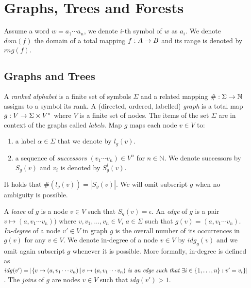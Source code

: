 \section{Graphs, Trees and Forests}
\label{sec:graph}

Assume a word $w = a_1 \cdots a_n$, we denote $i$-th symbol of $w$ as $a_i$.
We denote $dom(f)$ the domain of a total mapping $f: A \rightarrow B$ and its range is denoted by $rng(f)$.

\subsection{Graphs and Trees}
\label{subsec:graph}
A \emph{ranked alphabet} is a finite set of symbols $\Sigma$ and a related mapping $\#: \Sigma \rightarrow \mathbb{N}$
assigns to a symbol its rank.
A (directed, ordered, labelled) \emph{graph} is a total map $g: V \rightarrow \Sigma \times V^{*}$ where $V$ is a finite set of nodes.
The items of the set $\Sigma$ are in context of the graphs called \emph{labels}.
Map $g$ maps each node $v\in V$ to:
\begin{enumerate}
	\item a label $\alpha \in \Sigma$ that we denote by $l_g(v)$.
	\item a sequence of \emph{successors} $(v_1 \cdots v_n) \in V^n$ for $n \in \mathbb{N}$.
		We denote successors by $S_g(v)$ and $v_i$ is denoted by $S^i_g(v)$.
\end{enumerate}
It holds that $\#(l_g(v)) = |S_g(v)|$.
We will omit subscript $g$ when no ambiguity is possible.

A \emph{leave} of $g$ is a node $v \in V$ such that $S_g(v) = \epsilon$.
An \emph{edge} of $g$ is a pair $v \mapsto (a, v_1 \cdots v_n))$ where $v, v_1, \ldots, v_n \in V$,
$a \in \Sigma$ such that $g(v) = (a, v_1 \cdots v_n)$.
\emph{In-degree} of a node $v' \in V$ in graph $g$ is the overall number of its occurrences in $g(v)$ for any $v \in V$.
We denote in-degree of a node $v \in V$ by $idg_g(v)$ and we omit again subscript $g$ whenever it is possible.
More formally, in-degree is defined as $idg(v') = |\{v \mapsto (a, v_1 \cdots v_n) \,|\, v \mapsto (a, v_1 \cdots v_n)
\emph{ is an edge such that } \exists i \in \{1,\ldots,n\}: v' = v_i\}|$.
The \emph{joins} of $g$ are nodes $v \in V$ such that $idg(v') > 1$.

